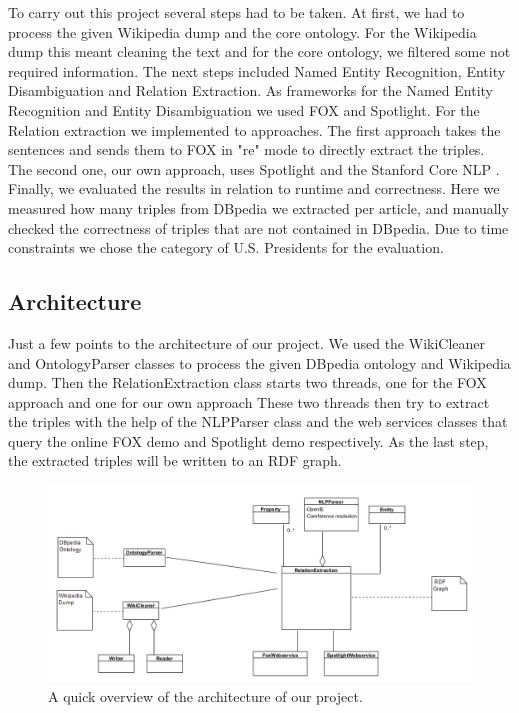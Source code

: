 \documentclass[runningheads]{llncs}
\begin{document}
To carry out this project several steps had to be taken. At first, we had to process the given Wikipedia dump and the core ontology. For the Wikipedia dump this meant cleaning the text and for the core ontology, we filtered some not required information. The next steps included Named Entity Recognition, Entity Disambiguation and Relation Extraction.
As frameworks for the Named Entity Recognition and Entity Disambiguation we used FOX and Spotlight. For the Relation extraction we implemented to approaches. The first approach takes the sentences and sends them to FOX in "re" mode to directly extract the triples. The second one, our own approach, uses Spotlight and the Stanford Core NLP \cite{stanford}. Finally, we evaluated the results in relation to runtime and correctness. Here we measured how many triples from DBpedia we extracted per article, and manually checked the correctness of triples that are not contained in DBpedia. Due to time constraints we chose the category of U.S. Presidents for the evaluation.

\subsection{Architecture}
Just a few points to the architecture of our project. We used the WikiCleaner and OntologyParser classes to process the given DBpedia ontology and Wikipedia dump. Then the RelationExtraction class starts two threads, one for the FOX approach and one for our own approach These two threads then try to extract the triples with the help of the NLPParser class and the web services classes that query the online FOX demo and Spotlight demo respectively. As the last step, the extracted triples will be written to an RDF graph.

\begin{figure}
\includegraphics[width=\textwidth]{architecture.png}
\caption{A quick overview of the architecture of our project.} \label{fig1}
\end{figure}
\end{document}
